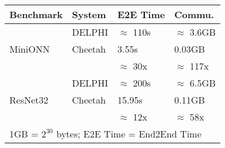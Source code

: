 \begin{tabular}{llll}
\hline
Benchmark        & System         & E2E Time              & Commu.                 \\ \hline
                 & DELPHI         & $\approx$ 110s        & $\approx$ 3.6GB        \\
MiniONN          & Cheetah        & 3.55s                 & 0.03GB                 \\ \cline{3-4} 
                 &                & $\approx$ 30x         & $\approx$ 117x         \\ \hline
                 & DELPHI         & $\approx$ 200s        & $\approx$ 6.5GB        \\
ResNet32         & Cheetah        & 15.95s                & 0.11GB                 \\ \cline{3-4} 
                 &                & $\approx$ 12x         & $\approx$ 58x          \\ \hline
\multicolumn{4}{l}{1GB = $2^{30}$ bytes; E2E Time = End2End Time}
\end{tabular}